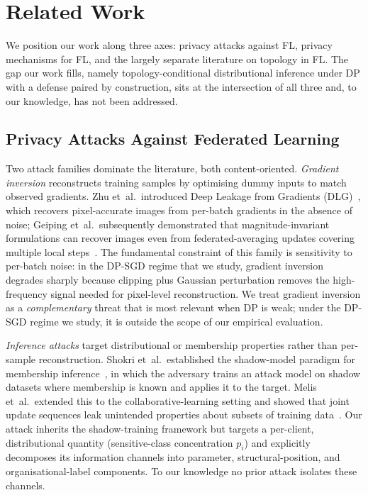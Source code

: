 \section{Related Work}
\label{sec:related}

We position our work along three axes: privacy attacks against FL,
privacy mechanisms for FL, and the largely separate literature on
topology in FL. The gap our work fills, namely topology-conditional
distributional inference under DP with a defense paired by construction,
sits at the intersection of all three and, to our knowledge, has
not been addressed.

\subsection{Privacy Attacks Against Federated Learning}
\label{sec:related-attacks}

Two attack families dominate the literature, both content-oriented.
\emph{Gradient inversion} reconstructs training samples by optimising
dummy inputs to match observed gradients. Zhu et~al.\ introduced Deep
Leakage from Gradients (DLG)~\cite{zhu2019dlg}, which recovers
pixel-accurate images from per-batch gradients in the absence of noise;
Geiping et~al.\ subsequently demonstrated that magnitude-invariant
formulations can recover images even from federated-averaging updates
covering multiple local steps~\cite{geiping2020inverting}. The fundamental
constraint of this family is sensitivity to per-batch noise: in the
DP-SGD regime that we study, gradient inversion degrades sharply because
clipping plus Gaussian perturbation removes the high-frequency signal
needed for pixel-level reconstruction. We treat gradient inversion as a
\emph{complementary} threat that is most relevant when DP is weak;
under the DP-SGD regime we study, it is outside the scope of our
empirical evaluation.

\emph{Inference attacks} target distributional or membership properties
rather than per-sample reconstruction. Shokri et~al.\ established the
shadow-model paradigm for membership inference~\cite{shokri2017membership},
in which the adversary trains an attack model on shadow datasets where
membership is known and applies it to the target. Melis et~al.\ extended
this to the collaborative-learning setting and showed that joint update
sequences leak unintended properties about subsets of training
data~\cite{melis2019exploiting}. Our \TADI attack inherits the
shadow-training framework but targets a per-client, distributional
quantity (sensitive-class concentration $p_i$) and explicitly decomposes
its information channels into parameter, structural-position, and
organisational-label components. To our knowledge no prior attack
isolates these channels.

